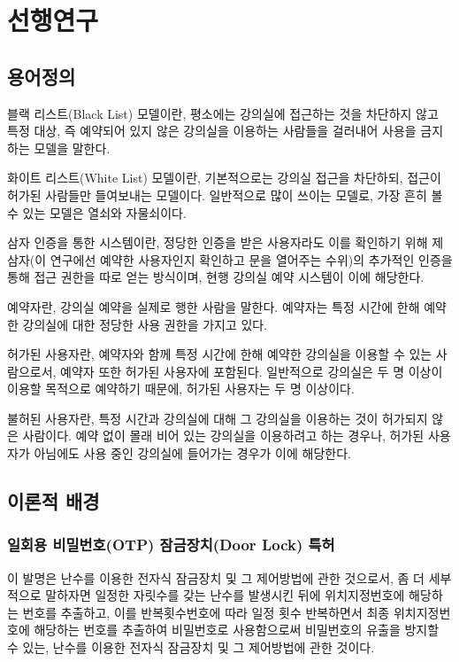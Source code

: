 \documentclass[11pt,a4paper]{article}
\begin{document}
\section{선행연구}

\subsection{용어정의}
블랙 리스트(Black List) 모델이란, 평소에는 강의실에 접근하는 것을 차단하지 않고
특정 대상, 즉 예약되어 있지 않은 강의실을 이용하는 사람들을 걸러내어 사용을
금지하는 모델을 말한다.

화이트 리스트(White List) 모델이란, 기본적으로는 강의실 접근을 차단하되, 접근이
허가된 사람들만 들여보내는 모델이다. 일반적으로 많이 쓰이는 모델로, 가장 흔히
볼 수 있는 모델은 열쇠와 자물쇠이다.

삼자 인증을 통한 시스템이란, 정당한 인증을 받은 사용자라도 이를 확인하기 위해
제삼자(이 연구에선 예약한 사용자인지 확인하고 문을 열어주는 수위)의 추가적인
인증을 통해 접근 권한을 따로 얻는 방식이며, 현행 강의실 예약 시스템이 이에
해당한다.

예약자란, 강의실 예약을 실제로 행한 사람을 말한다. 예약자는 특정 시간에 한해
예약한 강의실에 대한 정당한 사용 권한을 가지고 있다.

허가된 사용자란, 예약자와 함께 특정 시간에 한해 예약한 강의실을 이용할 수 있는
사람으로서, 예약자 또한 허가된 사용자에 포함된다. 일반적으로 강의실은 두 명
이상이 이용할 목적으로 예약하기 때문에, 허가된 사용자는 두 명 이상이다.

불허된 사용자란, 특정 시간과 강의실에 대해 그 강의실을 이용하는 것이 허가되지
않은 사람이다. 예약 없이 몰래 비어 있는 강의실을 이용하려고 하는 경우나, 허가된
사용자가 아님에도 사용 중인 강의실에 들어가는 경우가 이에 해당한다.

\subsection{이론적 배경}

\subsubsection{일회용 비밀번호(OTP) 잠금장치(Door Lock) 특허}
이 발명은 난수를 이용한 전자식 잠금장치 및 그 제어방법에 관한 것으로서, 좀 더
세부적으로 말하자면 일정한 자릿수를 갖는 난수를 발생시킨 뒤에 위치지정번호에
해당하는 번호를 추출하고, 이를 반복횟수번호에 따라 일정 횟수 반복하면서 최종
위치지정번호에 해당하는 번호를 추출하여 비밀번호로 사용함으로써 비밀번호의
유출을 방지할 수 있는, 난수를 이용한 전자식 잠금장치 및 그 제어방법에 관한
것이다.
\end{document}
